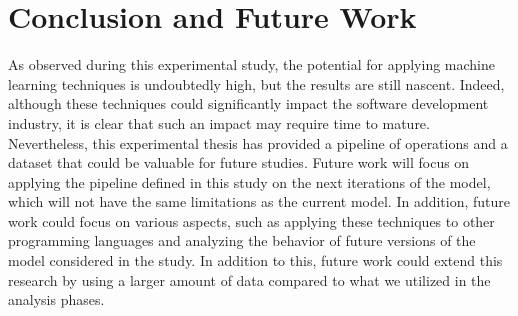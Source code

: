 \chapter{Conclusion and Future Work}
\label{Chapter6}
As observed during this experimental study, the potential for applying machine learning techniques is undoubtedly high, but the results are still nascent. Indeed, although these techniques could significantly impact the software development industry, it is clear that such an impact may require time to mature. Nevertheless, this experimental thesis has provided a pipeline of operations and a dataset that could be valuable for future studies. Future work will focus on applying the pipeline defined in this study on the next iterations of the model, which will not have the same limitations as the current model. In addition, future work could focus on various aspects, such as applying these techniques to other programming languages and analyzing the behavior of future versions of the model considered in the study. In addition to this, future work could extend this research by using a larger amount of data compared to what we utilized in the analysis phases.

